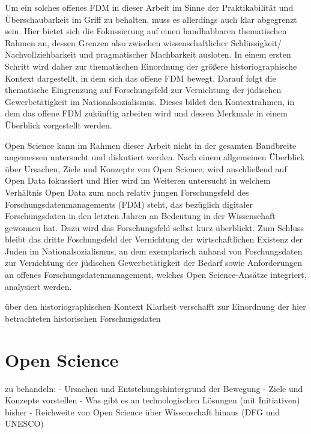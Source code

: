 \onehalfspacing







Um ein solches offenes FDM in dieser Arbeit im Sinne der Praktikabilität und Überschaubarkeit im Griff zu behalten, muss es allerdings auch klar abgegrenzt sein. Hier bietet sich die Fokussierung auf einen handhabbaren thematischen Rahmen an, dessen Grenzen also zwischen wissenschaftlicher Schlüssigkeit/ Nachvollziehbarkeit und pragmatischer Machbarkeit ausloten. In einem ersten Schritt wird daher zur thematischen Einordnung der größere  historiographische Kontext dargestellt, in dem sich das offene FDM bewegt. Darauf folgt die thematische Eingrenzung auf Forschungsfeld zur Vernichtung der jüdischen Gewerbetätigkeit im Nationalsozialismus. Dieses bildet den Kontextrahmen, in dem das offene FDM zukünftig arbeiten wird und dessen Merkmale in einem Überblick vorgestellt werden.



Open Science kann im Rahmen dieser Arbeit nicht in der gesamten Bandbreite angemessen untersucht und diskutiert werden. Nach einem allgemeinen Überblick über Ursachen, Ziele und Konzepte von Open Science, wird anschließend auf Open Data fokussiert und 
Hier wird im Weiteren untersucht in welchem Verhältnis Open Data zum noch relativ jungen Forschungsfeld des Forschungsdatenmanagements (FDM) steht, das bezüglich digitaler Forschungsdaten in den letzten Jahren an Bedeutung in der Wissenschaft gewonnen hat. Dazu wird das Forschungsfeld selbst kurz überblickt. Zum Schluss bleibt das dritte Foschungsfeld der Vernichtung der wirtschaftlichen Existenz der Juden im Nationalsozialismus, an dem exemplarisch anhand von Foschungsdaten zur Vernichtung der jüdischen Gewerbetätigkeit der Bedarf sowie Anforderungen an offenes Forschungsdatenmanagement, welches Open Science-Ansätze integriert, analysiert werden.

über den historiographischen Kontext Klarheit verschafft zur Einordnung der hier betrachteten historischen Forschungsdaten

\section{Open Science}

zu behandeln:
- Ursachen und Entstehungshintergrund der Bewegung
- Ziele und Konzepte vorstellen
- Was gibt es an technologischen Lösungen (mit Initiativen) bisher
- Reichweite von Open Science über Wissenschaft hinaus (DFG und UNESCO)

